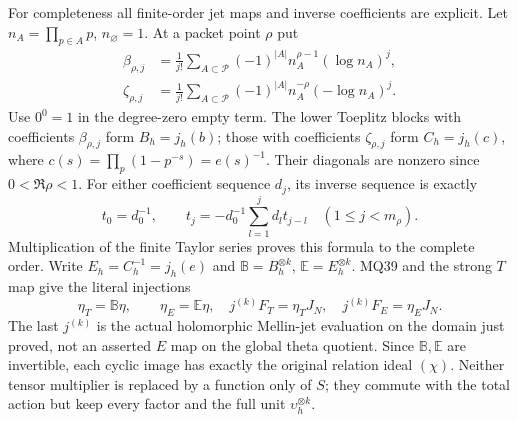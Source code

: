 \documentclass[11pt]{article}
\begin{document}
For completeness all finite-order jet maps and inverse coefficients
are explicit. Let $n_A=\prod_{p\in A}p$, $n_\varnothing=1$.
At a packet point $\rho$ put
\[
 \begin{split}
 \beta_{\rho,j}&=\frac1{j!}\sum_{A\subset\mathcal P}
       (-1)^{|A|}n_A^{\rho-1}(\log n_A)^j,\\
 \zeta_{\rho,j}&=\frac1{j!}\sum_{A\subset\mathcal P}
       (-1)^{|A|}n_A^{-\rho}(-\log n_A)^j.
 \end{split}                                                 \tag{MQ40}
\]
Use $0^0=1$ in the degree-zero empty term. The lower Toeplitz
blocks with coefficients $\beta_{\rho,j}$ form $B_h=j_h(b)$;
those with coefficients $\zeta_{\rho,j}$ form $C_h=j_h(c)$,
where $c(s)=\prod_p(1-p^{-s})=e(s)^{-1}$. Their diagonals are
nonzero since $0<\Re\rho<1$. For either coefficient sequence
$d_j$, its inverse sequence is exactly
\[
 t_0=d_0^{-1},\qquad
 t_j=-d_0^{-1}\sum_{l=1}^jd_lt_{j-l}\quad(1\le j<m_\rho).
                                                               \tag{MQ41}
\]
Multiplication of the finite Taylor series proves this formula to
the complete order. Write $E_h=C_h^{-1}=j_h(e)$ and
$\mathbb B=B_h^{\otimes k}$, $\mathbb E=E_h^{\otimes k}$.
MQ39 and the strong $T$ map give the literal injections
\[
 \eta_T=\mathbb B\eta,\qquad \eta_E=\mathbb E\eta,
 \quad j^{(k)}F_T=\eta_TJ_N,\quad j^{(k)}F_E=\eta_EJ_N.
                                                               \tag{MQ42}
\]
The last $j^{(k)}$ is the actual holomorphic Mellin-jet evaluation
on the domain just proved, not an asserted $E$ map on the global
theta quotient. Since $\mathbb B,\mathbb E$ are invertible, each
cyclic image has exactly the original relation ideal $(\chi)$.
Neither tensor multiplier is replaced by a function only of $S$;
they commute with the total action but keep every factor and the
full unit $\upsilon_h^{\otimes k}$.
\end{document}
